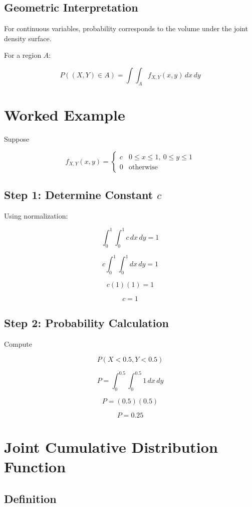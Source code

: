 \documentclass[11pt]{article}
\begin{document}
\subsection{Geometric Interpretation}

For continuous variables, probability corresponds to the volume under the joint density surface.

For a region \(A\):

\[
P((X,Y) \in A) =
\int\int_A f_{X,Y}(x,y)\,dx\,dy
\]

\section{Worked Example}

Suppose

\[
f_{X,Y}(x,y) =
\begin{cases}
c & 0 \le x \le 1,\ 0 \le y \le 1 \\
0 & \text{otherwise}
\end{cases}
\]

\subsection{Step 1: Determine Constant \(c\)}

Using normalization:

\[
\int_0^1 \int_0^1 c \, dx\,dy = 1
\]

\[
c \int_0^1 \int_0^1 dx\,dy = 1
\]

\[
c (1)(1) = 1
\]

\[
c = 1
\]

\subsection{Step 2: Probability Calculation}

Compute

\[
P(X < 0.5, Y < 0.5)
\]

\[
P =
\int_0^{0.5} \int_0^{0.5} 1 \, dx\,dy
\]

\[
P = (0.5)(0.5)
\]

\[
P = 0.25
\]

\section{Joint Cumulative Distribution Function}

\subsection{Definition}
\end{document}
